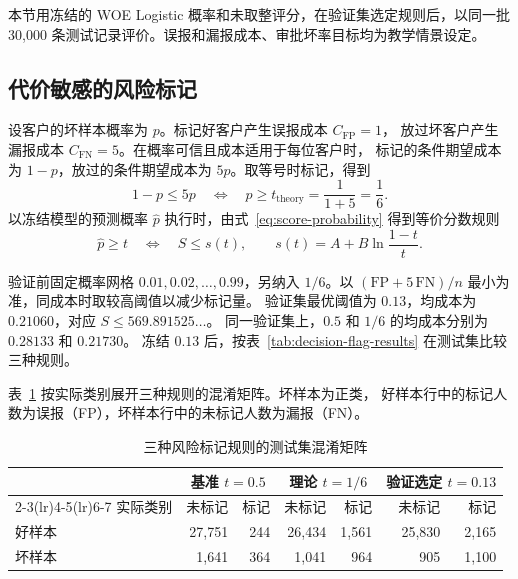 本节用冻结的 WOE Logistic 概率和未取整评分，在验证集选定规则后，以同一批
30,000 条测试记录评价。误报和漏报成本、审批坏率目标均为教学情景设定。

\subsection{代价敏感的风险标记}
设客户的坏样本概率为 $p$。标记好客户产生误报成本 $C_{\mathrm{FP}}=1$，
放过坏客户产生漏报成本 $C_{\mathrm{FN}}=5$。在概率可信且成本适用于每位客户时，
标记的条件期望成本为 $1-p$，放过的条件期望成本为 $5p$。取等号时标记，得到
\[
  1-p\leq 5p \quad\Longleftrightarrow\quad
  p\geq t_{\mathrm{theory}}=\frac{1}{1+5}=\frac16 .
\]
以冻结模型的预测概率 $\widehat p$ 执行时，由式~\eqref{eq:score-probability} 得到等价分数规则
\[
  \widehat p\geq t\quad\Longleftrightarrow\quad
  S\leq s(t),\qquad s(t)=A+B\ln\frac{1-t}{t}.
\]

验证前固定概率网格 $0.01,0.02,\ldots,0.99$，另纳入 $1/6$。以
$(\mathrm{FP}+5\,\mathrm{FN})/n$ 最小为准，同成本时取较高阈值以减少标记量。
验证集最优阈值为 $0.13$，均成本为 $0.21060$，对应 $S\leq 569.891525\ldots$。
同一验证集上，$0.5$ 和 $1/6$ 的均成本分别为 $0.28133$ 和 $0.21730$。
冻结 $0.13$ 后，按表~\ref{tab:decision-flag-results} 在测试集比较三种规则。

\begin{table}[H]
  \centering
  \caption{三种风险标记规则的测试集比较}
  \label{tab:decision-flag-results}
  \small
  \setlength{\tabcolsep}{3.5pt}
  

  \smallskip
\end{table}

表~\ref{tab:decision-confusion-matrices} 按实际类别展开三种规则的混淆矩阵。坏样本为正类，
好样本行中的标记人数为误报（FP），坏样本行中的未标记人数为漏报（FN）。

\begin{table}[H]
  \centering
  \caption{三种风险标记规则的测试集混淆矩阵}
  \label{tab:decision-confusion-matrices}
  \small
  \begin{tabular}{lrrrrrr}
    \toprule
    & \multicolumn{2}{c}{基准 \(t=0.5\)}
    & \multicolumn{2}{c}{理论 \(t=1/6\)}
    & \multicolumn{2}{c}{验证选定 \(t=0.13\)} \\
    \cmidrule(lr){2-3}\cmidrule(lr){4-5}\cmidrule(lr){6-7}
    实际类别 & 未标记 & 标记 & 未标记 & 标记 & 未标记 & 标记 \\
    \midrule
    好样本 & 27,751 & 244 & 26,434 & 1,561 & 25,830 & 2,165 \\
    坏样本 & 1,641 & 364 & 1,041 & 964 & 905 & 1,100 \\
    \bottomrule
  \end{tabular}
\end{table}

